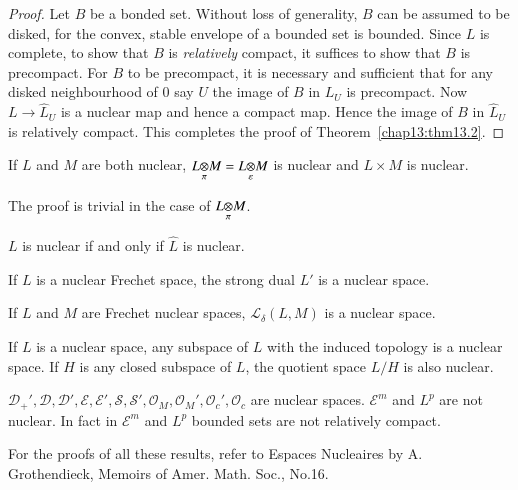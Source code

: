 \begin{proof}
Let $B$ be a bonded set. Without loss of generality, $B$ can be
assumed to be disked, for the convex, stable envelope of a bounded set
is bounded\pageoriginale. Since $L$ is complete, to show that $B$ is
\emph{relatively} compact, it suffices to show that $B$ is precompact. For
$B$ to be precompact, it is necessary and sufficient that for any
disked neighbourhood of $0$ say $U$ the image of $B$ in $L_U$ is
precompact. Now $L \to \hat{L}_U$ is a nuclear map and hence a compact
map. Hence the image of $B$ in $\hat{L}_U$ is relatively compact. This
completes the proof of Theorem~\ref{chap13:thm13.2}.
\end{proof}

\begin{theorem}\label{chap13:thm13.4}
If $L$ and $M$ are both nuclear, $\foprod{L}{M}{\pi}=
\foprod{L}{M}{\varepsilon}$ is nuclear and $L\times M$ is 
nuclear. 
\end{theorem}
\noindent The proof is trivial in the case of $\foprod{L}{M}{\pi}$.

\begin{theorem}\label{chap13:thm13.5}
$L$ is nuclear if and only if $\hat{L}$ is nuclear.
\end{theorem}

\begin{theorem}\label{chap13:thm13.6}
If $L$ is a nuclear Frechet space, the strong dual $L'$ is a nuclear space.
\end{theorem}

\begin{theorem}\label{chap13:thm13.7}
If $L$ and $M$ are Frechet nuclear spaces, $\mathscr{L}_\delta(L, M)$
is a nuclear space.
\end{theorem}

\begin{theorem}\label{chap13:thm13.8}
If $L$ is a nuclear space, any subspace of $L$ with the induced
topology is a nuclear space. If $H$ is any closed subspace of $L$, the
quotient space $L/H$ is also nuclear.
\end{theorem}

 $\mathscr{D}_+', \mathscr{D},
\mathscr{D}', \mathscr{E}, \mathscr{E}', \mathscr{S}, \mathscr{S}',
\mathscr{O}_M, \mathscr{O}_M', \mathscr{O}_c', \mathscr{O}_c$ are
nuclear spaces. $\mathscr{E}^m$ and $L^p$ are not nuclear. In fact in
$\mathscr{E}^m$ and $L^p$ bounded sets are not relatively compact.

For the proofs of all these results, refer to Espaces Nucleaires by
A. Grothendieck, Memoirs of Amer. Math. Soc., No.16.                               


